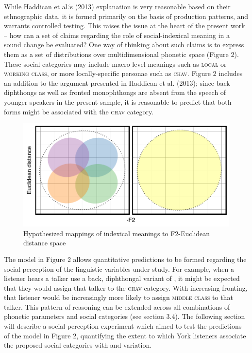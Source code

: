 \documentclass[PWPL]{article}
\begin{document}
 While Haddican et al.`s (2013) explanation is very reasonable based on their ethnographic data, it is formed primarily on the basis of production patterns, and warrants controlled testing. This raises the issue at the heart of the present work -- how can a set of claims regarding the role of social-indexical meaning in a sound change be evaluated? One way of thinking about such claims is to express them as a set of distributions over multidimensional phonetic space (Figure 2). These social categories may include macro-level meanings such as \textsc{local} or \textsc{working class}, or more locally-specific personae such as \textsc{chav}. Figure 2 includes an addition to the argument presented in Haddican et al. (2013); since back  diphthongs as well as fronted  monophthongs are absent from the speech of younger speakers in the present sample, it is reasonable to predict that both forms might be associated with the \textsc{chav} category.

\begin{figure}[ht]
\centering
\caption{Hypothesized mappings of indexical meanings to F2-Euclidean distance space}
\includegraphics[scale=0.5]{predictions.pdf}
\end{figure}

The model in Figure 2 allows quantitative predictions to be formed regarding the social perception of the linguistic variables under study. For example, when a listener hears a talker use a back, diphthongal variant of , it might be expected that they would assign that talker to the \textsc{chav} category. With increasing fronting, that listener would be increasingly more likely to assign \textsc{middle class} to that talker. This pattern of reasoning can be extended across all combinations of phonetic parameters and social categories (see section 3.4). The following section will describe a social perception experiment which aimed to test the predictions of the model in Figure 2, quantifying the extent to which York listeners associate the proposed social categories with  and  variation. 
\end{document}
